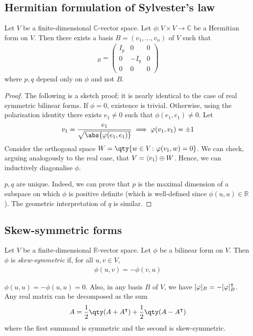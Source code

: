\subsection{Hermitian formulation of Sylvester's law}
\begin{theorem}
	Let $V$ be a finite-dimensional $\mathbb C$-vector space.
	Let $\phi \colon V \times V \to \mathbb C$ be a Hermitian form on $V$.
	Then there exists a basis $B = (v_1, \dots, v_n)$ of $V$ such that
	\begin{align*}
		[\phi]_B = \begin{pmatrix}
			I_p & 0    & 0 \\
			0   & -I_q & 0 \\
			0   & 0    & 0
		\end{pmatrix}
	\end{align*}
	where $p, q$ depend only on $\phi$ and not $B$.
\end{theorem}
\begin{proof}
	The following is a sketch proof; it is nearly identical to the case of real symmetric bilinear forms.
	If $\phi = 0$, existence is trivial.
	Otherwise, using the polarisation identity there exists $e_1 \neq 0$ such that $\phi(e_1, e_1) \neq 0$.
	Let
	\begin{align*}
		v_1 = \frac{e_1}{\sqrt{\abs{\phi(e_1, e_1)}}} \implies \phi(v_1, v_1) = \pm 1
	\end{align*}
	Consider the orthogonal space $W = \qty{w \in V \colon \phi(v_1, w) = 0}$.
	We can check, arguing analogously to the real case, that $V = \langle{} v_1 \rangle \oplus W$.
	Hence, we can inductively diagonalise $\phi$.

	$p, q$ are unique.
	Indeed, we can prove that $p$ is the maximal dimension of a subspace on which $\phi$ is positive definite (which is well-defined since $\phi(u,u) \in \mathbb R$).
	The geometric interpretation of $q$ is similar.
\end{proof}

\subsection{Skew-symmetric forms}
\begin{definition}
	Let $V$ be a finite-dimensional $\mathbb R$-vector space.
	Let $\phi$ be a bilinear form on $V$.
	Then $\phi$ is \textit{skew-symmetric} if, for all $u,v \in V$,
	\begin{align*}
		\phi(u,v) = -\phi(v,u)
	\end{align*}
\end{definition}
\begin{remark}
	$\phi(u,u) = -\phi(u,u) = 0$.
	Also, in any basis $B$ of $V$, we have $[\varphi]_B = -[\varphi]_B^\intercal$.
	Any real matrix can be decomposed as the sum
	\begin{align*}
		A = \frac{1}{2}\qty(A + A^\transpose) + \frac{1}{2}\qty(A - A^\transpose)
	\end{align*}
	where the first summand is symmetric and the second is skew-symmetric.
\end{remark}

